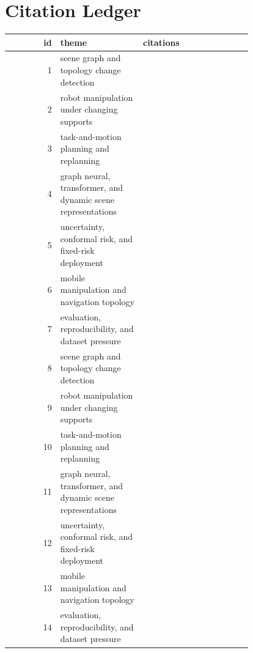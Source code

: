 \documentclass{article}
\begin{document}
\section{Citation Ledger}
\begingroup
\scriptsize
\setlength{\tabcolsep}{4pt}
\begin{longtable}{r p{0.34\linewidth} p{0.45\linewidth}}
\toprule
id & theme & citations\\
\midrule
1 & scene graph and topology change detection & \citep{yang2022scene1,fyleris2022urban2,guo2026ssprcd3} \\
2 & robot manipulation under changing supports & \citep{doi2022detecting4,cheng2024change5,mehan2024questmaps6} \\
3 & task-and-motion planning and replanning & \citep{muhammad2022visionbased7,shi2020change8,gu2019a9} \\
4 & graph neural, transformer, and dynamic scene representations & \citep{xiong1998efficient10,chen2025crossviewpoint11,wu2021a12} \\
5 & uncertainty, conformal risk, and fixed-risk deployment & \citep{liu2025from13,mittal2009scene14,chughtai2023object15} \\
6 & mobile manipulation and navigation topology & \citep{martinson2026integrating16,park2025visual17,ryde2011alignment18} \\
7 & evaluation, reproducibility, and dataset pressure & \citep{riel2019improved19,chartounyndmultimodel20,wang2024contrastive21} \\
8 & scene graph and topology change detection & \citep{engelbracht2024spotlight22,balasingam2025graph23,cheong2000scenebased24} \\
9 & robot manipulation under changing supports & \citep{moon2019pddl25,chong2026robust26,sakurada2020weakly27} \\
10 & task-and-motion planning and replanning & \citep{lin2025robust28,mujkic2023framework29,sharma2022early30} \\
11 & graph neural, transformer, and dynamic scene representations & \citep{liu2025path31,li2008a32,murlidaran2025eye33} \\
12 & uncertainty, conformal risk, and fixed-risk deployment & \citep{yan2025intelligent34,dematti2025realtime35,dematti2025realtime36} \\
13 & mobile manipulation and navigation topology & \citep{li2026a37,huang2024citypulse38,simeonov2026realtime39} \\
14 & evaluation, reproducibility, and dataset pressure & \citep{rong2024driving40,maham2025deep41,zhang2026grasping42} \\

\end{longtable}
\end{document}
